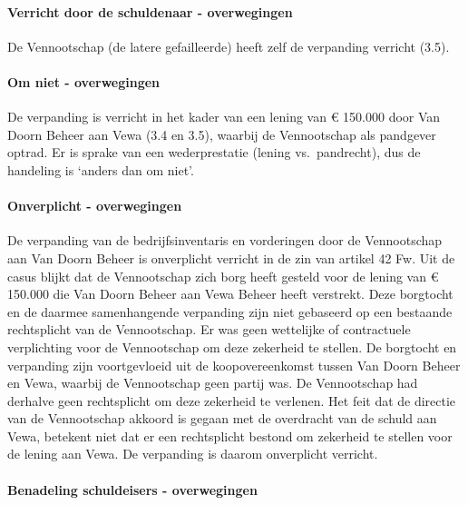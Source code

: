 \documentclass[
  dutch,
  a4paper,
]{article}
\begin{document}
\paragraph{Verricht door de schuldenaar - overwegingen}\label{verricht-door-de-schuldenaar---overwegingen}

De Vennootschap (de latere gefailleerde) heeft zelf de verpanding verricht (3.5).

\paragraph{Om niet - overwegingen}\label{om-niet---overwegingen}

De verpanding is verricht in het kader van een lening van € 150.000 door Van Doorn Beheer aan Vewa (3.4 en 3.5), waarbij de Vennootschap als pandgever optrad. Er is sprake van een wederprestatie (lening vs.~pandrecht), dus de handeling is `anders dan om niet'.

\paragraph{Onverplicht - overwegingen}\label{onverplicht---overwegingen}

De verpanding van de bedrijfsinventaris en vorderingen door de Vennootschap aan Van Doorn Beheer is onverplicht verricht in de zin van artikel 42 Fw. Uit de casus blijkt dat de Vennootschap zich borg heeft gesteld voor de lening van € 150.000 die Van Doorn Beheer aan Vewa Beheer heeft verstrekt. Deze borgtocht en de daarmee samenhangende verpanding zijn niet gebaseerd op een bestaande rechtsplicht van de Vennootschap. Er was geen wettelijke of contractuele verplichting voor de Vennootschap om deze zekerheid te stellen. De borgtocht en verpanding zijn voortgevloeid uit de koopovereenkomst tussen Van Doorn Beheer en Vewa, waarbij de Vennootschap geen partij was. De Vennootschap had derhalve geen rechtsplicht om deze zekerheid te verlenen. Het feit dat de directie van de Vennootschap akkoord is gegaan met de overdracht van de schuld aan Vewa, betekent niet dat er een rechtsplicht bestond om zekerheid te stellen voor de lening aan Vewa. De verpanding is daarom onverplicht verricht.

\paragraph{Benadeling schuldeisers - overwegingen}\label{benadeling-schuldeisers---overwegingen}
\end{document}
